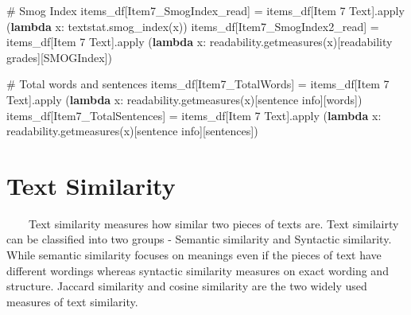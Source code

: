 \documentclass[
  letterpaper,
  DIV=11,
  numbers=noendperiod]{scrreprt}
\newenvironment{Shaded}{\begin{snugshade}}{\end{snugshade}}
\newcommand{\BuiltInTok}[1]{\textcolor[rgb]{0.00,0.23,0.31}{#1}}
\newcommand{\CommentTok}[1]{\textcolor[rgb]{0.37,0.37,0.37}{#1}}
\newcommand{\KeywordTok}[1]{\textcolor[rgb]{0.00,0.23,0.31}{\textbf{#1}}}
\newcommand{\NormalTok}[1]{\textcolor[rgb]{0.00,0.23,0.31}{#1}}
\newcommand{\OperatorTok}[1]{\textcolor[rgb]{0.37,0.37,0.37}{#1}}
\newcommand{\StringTok}[1]{\textcolor[rgb]{0.13,0.47,0.30}{#1}}
\begin{document}
\begin{Shaded}
\begin{Highlighting}[]
\CommentTok{\# Smog Index}
\NormalTok{items\_df[}\StringTok{\textquotesingle{}Item7\_SmogIndex\_read\textquotesingle{}}\NormalTok{] }\OperatorTok{=}\NormalTok{ items\_df[}\StringTok{\textquotesingle{}Item 7 Text\textquotesingle{}}\NormalTok{].}\BuiltInTok{apply}\NormalTok{ (}\KeywordTok{lambda}\NormalTok{ x: textstat.smog\_index(x))}
\NormalTok{items\_df[}\StringTok{\textquotesingle{}Item7\_SmogIndex2\_read\textquotesingle{}}\NormalTok{] }\OperatorTok{=}\NormalTok{ items\_df[}\StringTok{\textquotesingle{}Item 7 Text\textquotesingle{}}\NormalTok{].}\BuiltInTok{apply}\NormalTok{ (}\KeywordTok{lambda}\NormalTok{ x: readability.getmeasures(x)[}\StringTok{\textquotesingle{}readability grades\textquotesingle{}}\NormalTok{][}\StringTok{\textquotesingle{}SMOGIndex\textquotesingle{}}\NormalTok{])}

\CommentTok{\# Total words and sentences }
\NormalTok{items\_df[}\StringTok{\textquotesingle{}Item7\_TotalWords\textquotesingle{}}\NormalTok{] }\OperatorTok{=}\NormalTok{ items\_df[}\StringTok{\textquotesingle{}Item 7 Text\textquotesingle{}}\NormalTok{].}\BuiltInTok{apply}\NormalTok{ (}\KeywordTok{lambda}\NormalTok{ x: readability.getmeasures(x)[}\StringTok{\textquotesingle{}sentence info\textquotesingle{}}\NormalTok{][}\StringTok{\textquotesingle{}words\textquotesingle{}}\NormalTok{])}
\NormalTok{items\_df[}\StringTok{\textquotesingle{}Item7\_TotalSentences\textquotesingle{}}\NormalTok{] }\OperatorTok{=}\NormalTok{ items\_df[}\StringTok{\textquotesingle{}Item 7 Text\textquotesingle{}}\NormalTok{].}\BuiltInTok{apply}\NormalTok{ (}\KeywordTok{lambda}\NormalTok{ x: readability.getmeasures(x)[}\StringTok{\textquotesingle{}sentence info\textquotesingle{}}\NormalTok{][}\StringTok{\textquotesingle{}sentences\textquotesingle{}}\NormalTok{])}
\end{Highlighting}
\end{Shaded}

\section{Text Similarity}\label{text-similarity}

~~~~Text similarity measures how similar two pieces of texts are. Text
similairty can be classified into two groups - Semantic similarity and
Syntactic similarity. While semantic similarity focuses on meanings even
if the pieces of text have different wordings whereas syntactic
similarity measures on exact wording and structure. Jaccard similarity
and cosine similarity are the two widely used measures of text
similarity.
\end{document}
